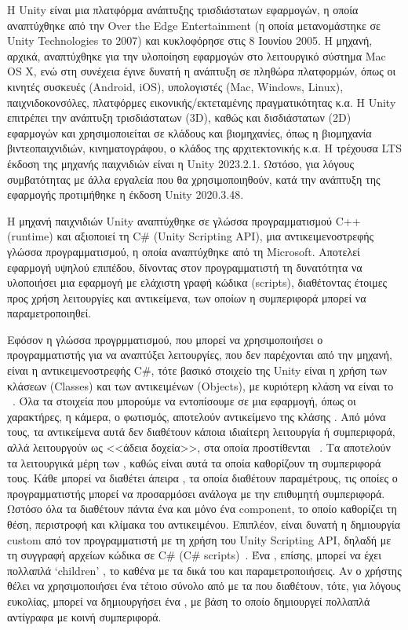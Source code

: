 Η Unity είναι μια πλατφόρμα ανάπτυξης τρισδιάστατων εφαρμογών, η οποία αναπτύχθηκε από την Over the Edge Entertainment (η οποία μετανομάστηκε σε Unity Technologies το 2007) και κυκλοφόρησε στις 8 Ιουνίου 2005. Η μηχανή, αρχικά, αναπτύχθηκε για την υλοποίηση εφαρμογών στο λειτουργικό σύστημα Mac OS X, ενώ στη συνέχεια έγινε δυνατή η ανάπτυξη σε πληθώρα πλατφορμών, όπως οι κινητές συσκευές (Android, iOS), υπολογιστές (Mac, Windows, Linux), παιχνιδοκονσόλες, πλατφόρμες εικονικής/εκτεταμένης πραγματικότητας κ.α. Η Unity επιτρέπει την ανάπτυξη τρισδιάστατων (3D), καθώς και δισδιάστατων (2D) εφαρμογών και χρησιμοποιείται σε κλάδους και βιομηχανίες, όπως η βιομηχανία βιντεοπαιχνιδιών, κινηματογράφου, ο κλάδος της αρχιτεκτονικής κ.α. Η τρέχουσα LTS έκδοση της μηχανής παιχνιδιών είναι η Unity 2023.2.1. Ωστόσο, για λόγους συμβατότητας με άλλα εργαλεία που θα χρησιμοποιηθούν, κατά την ανάπτυξη της εφαρμογής προτιμήθηκε η έκδοση Unity 2020.3.48.

Η μηχανή παιχνιδιών Unity αναπτύχθηκε σε γλώσσα προγραμματισμού C++ (runtime) και αξιοποιεί τη C\# (Unity Scripting API), μια αντικειμενοστρεφής γλώσσα προγραμματισμού, η οποία αναπτύχθηκε από τη Microsoft. Αποτελεί εφαρμογή υψηλού επιπέδου, δίνοντας στον προγραμματιστή τη δυνατότητα να υλοποιήσει μια εφαρμογή με ελάχιστη γραφή κώδικα (scripts), διαθέτοντας έτοιμες προς χρήση λειτουργίες και αντικείμενα, των οποίων η συμπεριφορά μπορεί να παραμετροποιηθεί.

Εφόσον η γλώσσα προγρμματισμού, που μπορεί να χρησιμοποιήσει ο προγραμματιστής για να αναπτύξει λειτουργίες, που δεν παρέχονται από την μηχανή, είναι η αντικειμενοστρεφής C\#, τότε βασικό στοιχείο της Unity είναι η χρήση των κλάσεων (Classes) και των αντικειμένων (Objects), με κυριότερη κλάση να είναι το ~\cite{unitytechnologies_2023_gameobjects}. Όλα τα στοιχεία που μπορούμε να εντοπίσουμε σε μια εφαρμογή, όπως οι χαρακτήρες, η κάμερα, ο φωτισμός, αποτελούν αντικείμενο της κλάσης . Από μόνα τους, τα αντικείμενα αυτά δεν διαθέτουν κάποια ιδιαίτερη λειτουργία ή συμπεριφορά, αλλά λειτουργούν ως <<άδεια δοχεία>>, στα οποία προστίθενται ~\cite{unitytechnologies_2023_introduction}. Τα  αποτελούν τα λειτουργικά μέρη των , καθώς είναι αυτά τα οποία καθορίζουν τη συμπεριφορά τους. Κάθε  μπορεί να διαθέτει άπειρα , τα οποία διαθέτουν παραμέτρους, τις οποίες ο προγραμματιστής μπορεί να προσαρμόσει ανάλογα με την επιθυμητή συμπεριφορά. Ωστόσο όλα τα  διαθέτουν πάντα ένα και μόνο ένα  component, το οποίο καθορίζει τη θέση, περιστροφή και κλίμακα του αντικειμένου. Επιπλέον, είναι δυνατή η δημιουργία custom  από τον προγραμματιστή με τη χρήση του Unity Scripting API, δηλαδή με τη συγγραφή αρχείων κώδικα σε C\# (C\# scripts)~\cite{unitytechnologies_2023_creating}. Ένα , επίσης, μπορεί να έχει πολλαπλά `children' , το καθένα με τα δικά του  και παραμετροποιήσεις. Αν ο χρήστης θέλει να χρησιμοποιήσει ένα τέτοιο σύνολο από  με τα  που διαθέτουν, τότε, για λόγους ευκολίας, μπορεί να δημιουργήσει ένα , με βάση το οποίο δημιουργεί πολλαπλά αντίγραφα με κοινή συμπεριφορά.

